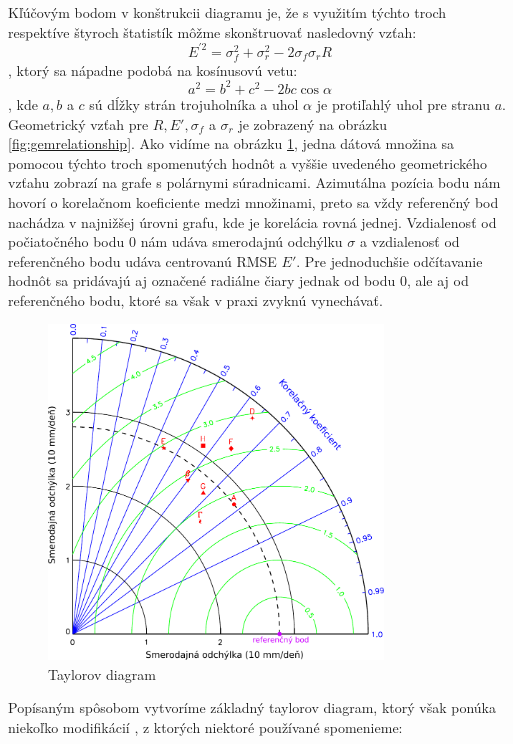 Kľúčovým bodom v konštrukcii diagramu je, že s využitím týchto troch respektíve štyroch štatistík môžme skonštruovať nasledovný vzťah:
\[
	E^{\prime2} = \sigma_{f}^{2} + \sigma_{r}^{2} - 2\sigma_{f}\sigma_{r}R
\]
, ktorý sa nápadne podobá na kosínusovú vetu:
\[
	a^{2} = b^{2} + c^{2} - 2bc\cos\alpha 
\]
, kde $ a, b $ a $ c $ sú dĺžky strán trojuholníka a uhol $ \alpha $ je protiľahlý uhol pre stranu $ a $. Geometrický vzťah pre $ R, E', \sigma_{f} $ a $ \sigma_{r} $ je zobrazený na obrázku \ref{fig:gemrelationship}. Ako vidíme na obrázku \ref{fig:taylordiagram}, jedna dátová množina sa pomocou týchto troch spomenutých hodnôt a vyššie uvedeného geometrického vzťahu zobrazí na grafe s polárnymi súradnicami. Azimutálna pozícia bodu nám hovorí o korelačnom koeficiente medzi množinami, preto sa vždy referenčný bod nachádza v najnižšej úrovni grafu, kde je korelácia rovná jednej. Vzdialenosť od počiatočného bodu $ 0 $ nám udáva smerodajnú odchýlku $ \sigma $ a vzdialenosť od referenčného bodu udáva centrovanú RMSE $ E' $. Pre jednoduchšie odčítavanie hodnôt sa pridávajú aj označené radiálne čiary jednak od bodu $ 0 $, ale aj od referenčného bodu, ktoré sa však v praxi zvyknú vynechávať.

\begin{figure}
	\centering
	\includegraphics[width = 3.5in]{taylordiagram}
	\caption{ Taylorov diagram \cite{Taylor} }
	\label{fig:taylordiagram}
\end{figure}

Popísaným spôsobom vytvoríme základný taylorov diagram, ktorý však ponúka niekoľko modifikácií \cite{TaylorPrime}, z ktorých niektoré používané spomenieme:


